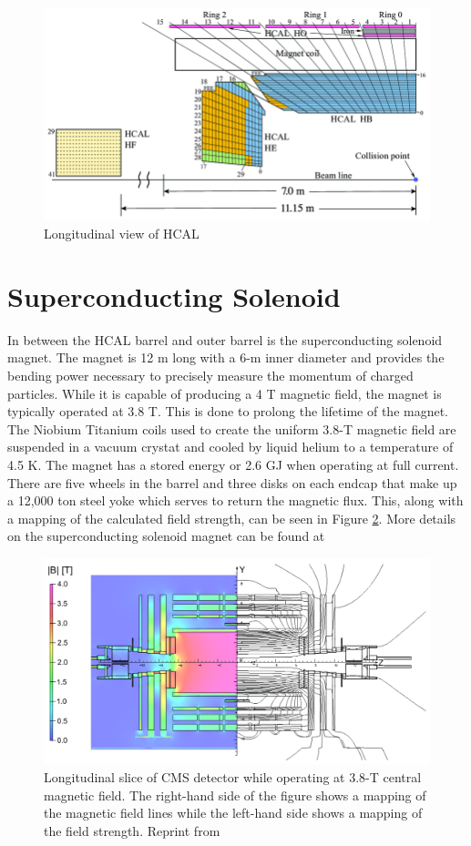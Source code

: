 \begin{figure}[h]
	\centering
	\includegraphics[width=0.7\linewidth]{Figures/hcal_longitudinal}
	\caption{Longitudinal view of HCAL \cite{CERN-LHCC-97-031}}
	\label{fig:hcallongitudinal}
\end{figure}

\section{Superconducting Solenoid}
In between the HCAL barrel and outer barrel is the superconducting solenoid magnet.  The magnet is 12 m long with a 6-m inner diameter and provides the bending power necessary to precisely measure the momentum of charged particles.  While it is capable of producing a 4 T magnetic field, the magnet is typically operated at 3.8 T.  This is done to prolong the lifetime of the magnet.  The Niobium Titanium coils used to create the uniform 3.8-T magnetic field are suspended in a vacuum crystat and cooled by liquid helium to a temperature of 4.5 K.  The magnet has a stored energy or 2.6 GJ when operating at full current.  There are five wheels in the barrel and three disks on each endcap that make up a 12,000 ton steel yoke which serves to return the magnetic flux.  This, along with a mapping of the calculated field strength, can be seen in Figure \ref{fig:solenoidmagnet}.  More details on the superconducting solenoid magnet can be found at \cite{CERN-LHCC-97-033}

\begin{figure}[h]
	\centering
	\includegraphics[width=0.9\linewidth]{Figures/Solenoidmagnet}
	\caption{Longitudinal slice of CMS detector while operating at 3.8-T central magnetic field. The right-hand side of the figure shows a mapping of the magnetic field lines while the left-hand side shows a mapping of the field strength. Reprint from \cite{Chatrchyan:2009si}}
	\label{fig:solenoidmagnet}
\end{figure}




